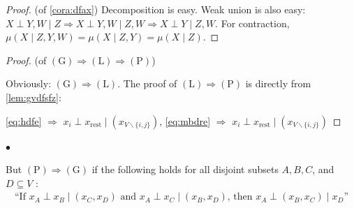 \documentclass{article}
\begin{document}
\begin{proof} (of \cref{cora:dfax})
Decomposition is easy. Weak union is also easy: ${X} \perp {Y}, {W} \mid {Z} \Longrightarrow {X} \perp {Y}, W \mid {Z}, {W} \Longrightarrow {X} \perp {Y} \mid {Z}, {W}$.  For contraction, $\mu({X} \mid {Z}, {Y},W ) = \mu({X} \mid {Z}, Y ) = \mu({X} \mid {Z})$.
\end{proof}
\begin{proof} (of  $(\mathrm{G}) \Rightarrow(\mathrm{L}) \Rightarrow(\mathrm{P})$)

Obviously: $(\mathrm{G}) \Rightarrow(\mathrm{L})$. The proof of  $(\mathrm{L}) \Rightarrow(\mathrm{P})$ is directly from \cref{lem:gvdfsfz}: 

\cref{eq:hdfe} $\Longrightarrow$ $x_{i} \perp x_{\mathrm{rest}} \mid \left(x_{V \backslash\{i, j\}}\right) $, \cref{eq:mbdre} $\Longrightarrow$ $x_{i} \perp x_{\mathrm{rest}} \mid\left(x_{V \backslash\{i, j\}}\right)$
\end{proof}

$\bullet$ 

But $(\mathrm{P}) \Rightarrow(\mathrm{G})$ if the following holds for all disjoint subsets $A, B, C$, and $D \subseteq V$ :
\begin{align}
   \text{``If $x_{A} \perp x_{B} \mid\left(x_{C}, x_{D}\right)$ and $x_{A} \perp x_{C} \mid\left(x_{B}, x_{D}\right)$, then $x_{A} \perp\left(x_{B}, x_{C}\right) \mid x_{D}$''}  \label{eq:hdfz}
\end{align}
\end{document}
